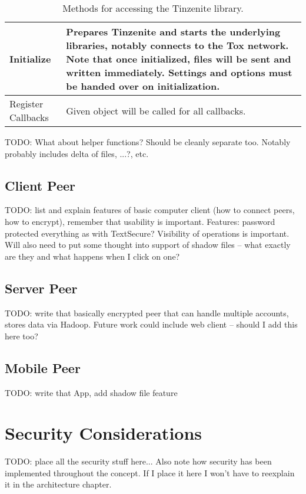\begin{table}[H]
\centering
\begin{tabulary}{\textwidth}{p{2.5cm} || J}
	Initialize & Prepares Tinzenite and starts the underlying libraries, notably connects to the Tox network. Note that once initialized, files will be sent and written immediately. Settings and options must be handed over on initialization.\\
	\hline
    Register Callbacks & Given object will be called for all callbacks.\\
\end{tabulary}
\caption[Tinzenite Library API]{Methods for accessing the Tinzenite library.}
\label{table:lib:api}
\end{table}

TODO: What about helper functions?
Should be cleanly separate too.
Notably probably includes delta of files, ...?, etc.

\subsection{Client Peer}

TODO: list and explain features of basic computer client (how to connect peers, how to encrypt), remember that usability is important.
Features: password protected everything as with TextSecure?
Visibility of operations is important.
Will also need to put some thought into support of shadow files – what exactly are they and what happens when I click on one?

\subsection{Server Peer}

TODO: write that basically encrypted peer that can handle multiple accounts, stores data via Hadoop.
Future work could include web client – should I add this here too?

\subsection{Mobile Peer}

TODO: write that App, add shadow file feature

\section{Security Considerations}

TODO: place all the security stuff here...
Also note how security has been implemented throughout the concept.
If I place it here I won't have to reexplain it in the architecture chapter.
